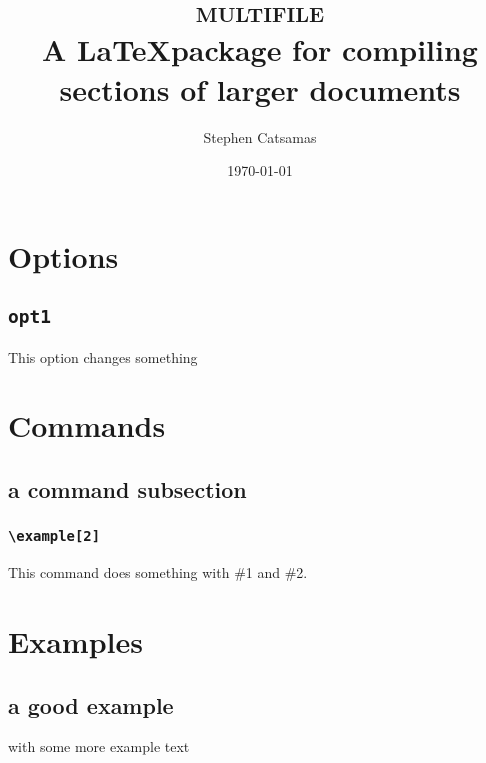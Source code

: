 \documentclass{article}
\title{\Huge\textsc{multifile} \\\vspace*{1 em}
    \large A \LaTeX package for compiling sections of larger documents}
\author{Stephen Catsamas}
\date{\today}
\begin{document}
\maketitle
\tableofcontents


\section{Options}
\subsection{\texttt{opt1}}\label{sec:opt:opt1}
    This option changes something

\section{Commands}
\subsection{a command subsection}\label{sec:com:example}

\subsubsection{\texttt{\textbackslash example[2]}}
    This command does something with \#1 and \#2.


\section{Examples}
\subsection{a good example}
with some more example text
\end{document}

